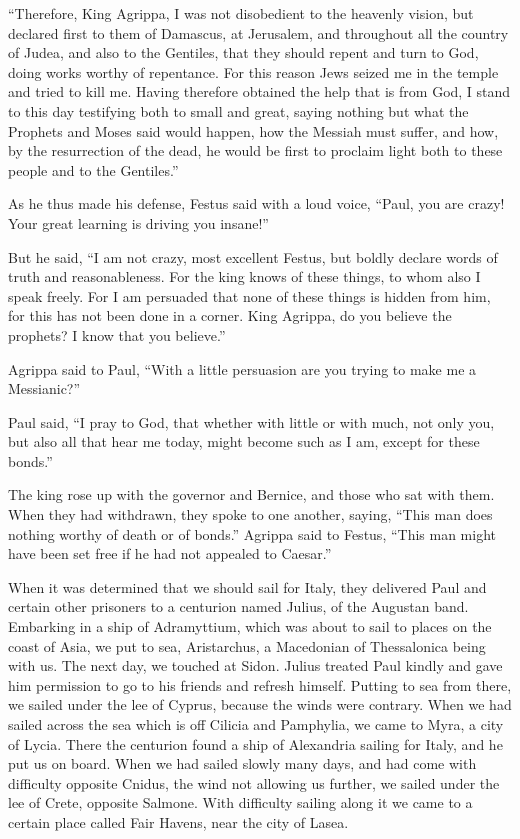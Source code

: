 \myverse{}“Therefore, King Agrippa, I was not disobedient to the heavenly
vision,
\myverse{}but declared first to them of Damascus, at Jerusalem, and throughout all
the country of Judea, and also to the Gentiles, that they should repent and turn to God, doing works worthy
of repentance.
\myverse{}For this reason Jews seized me in the temple and tried to kill me.
\myverse{}Having therefore obtained the help that is from God, I stand to this day
testifying both to small and great, saying nothing but what the Prophets and Moses said would happen,
\myverse{}how the Messiah must suffer, and how, by the resurrection of the dead, he
would be first to proclaim light both to these people and to the Gentiles.”

\myverse{}As he thus made his defense, Festus said with a loud voice,
“Paul, you are crazy! Your great learning is driving you insane!”

\myverse{}But he said, “I am not crazy, most excellent Festus, but boldly
declare words of truth and reasonableness.
\myverse{}For the king knows of these things, to whom also I speak freely. For I am
persuaded that none of these things is hidden from him, for this has not been done in a corner.
\myverse{}King Agrippa, do you believe the prophets? I know that you believe.”

\myverse{}Agrippa said to Paul, “With a little persuasion are you trying
to make me a Messianic?”

\myverse{}Paul said, “I pray to God, that whether with little or with
much, not only you, but also all that hear me today, might become such as I am, except for these bonds.”

\myverse{}The king rose up with the governor and Bernice, and those who
sat with them.
\myverse{}When they had withdrawn, they spoke to one another, saying, “This man does
nothing worthy of death or of bonds.”
\myverse{}Agrippa said to Festus, “This man might have been set free if he had not
appealed to Caesar.”


\mychapter{} \myverse*{}When it was determined that we should sail for Italy, they delivered
Paul and certain other prisoners to a centurion named Julius, of the Augustan band.
\myverse{}Embarking in a ship of Adramyttium, which was about to sail to places on the
coast of Asia, we put to sea, Aristarchus, a Macedonian of Thessalonica being with us.
\myverse{}The next day, we touched at Sidon. Julius treated Paul kindly and gave him
permission to go to his friends and refresh himself.
\myverse{}Putting to sea from there, we sailed under the lee of Cyprus, because the winds
were contrary.
\myverse{}When we had sailed across the sea which is off Cilicia and Pamphylia, we came
to Myra, a city of Lycia.
\myverse{}There the centurion found a ship of Alexandria sailing for Italy, and he put
us on board.
\myverse{}When we had sailed slowly many days, and had come with difficulty opposite
Cnidus, the wind not allowing us further, we sailed under the lee of Crete, opposite Salmone.
\myverse{}With difficulty sailing along it we came to a certain place called Fair Havens,
near the city of Lasea.

